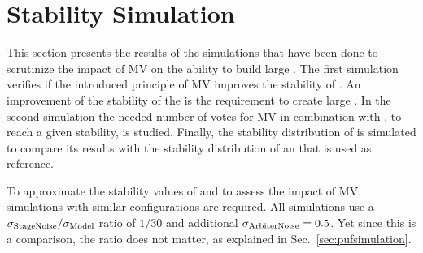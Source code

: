\chapter{Stability Simulation}
\label{cap:stabilitysimulation}

This section presents the results of the simulations that have been done to scrutinize the impact of \ac{MV} on the ability to build large \mxpufs.
The first simulation verifies if the introduced principle of \ac{MV} improves the stability of \apuf.
An improvement of the stability of the \apufs is the requirement to create large \xpufs.
In the second simulation the needed number of votes for \ac{MV} in combination with \xpufs, to reach a given stability, is studied.
Finally, the stability distribution of \mxpufs is simulated to compare its results with the stability distribution of an \apuf that is used as reference.

To approximate the stability values of \pufs and to assess the impact of \ac{MV}, simulations with similar configurations are required.
All simulations use a $\sigma_{\mathrm{Stage Noise}}/\sigma_{\mathrm{Model}}$ ratio of $1/30$ and additional $\sigma_{\mathrm{Arbiter Noise}} = 0.5$.
Yet since this is a comparison, the ratio does not matter, as explained in Sec.\ \ref{sec:pufsimulation}.


